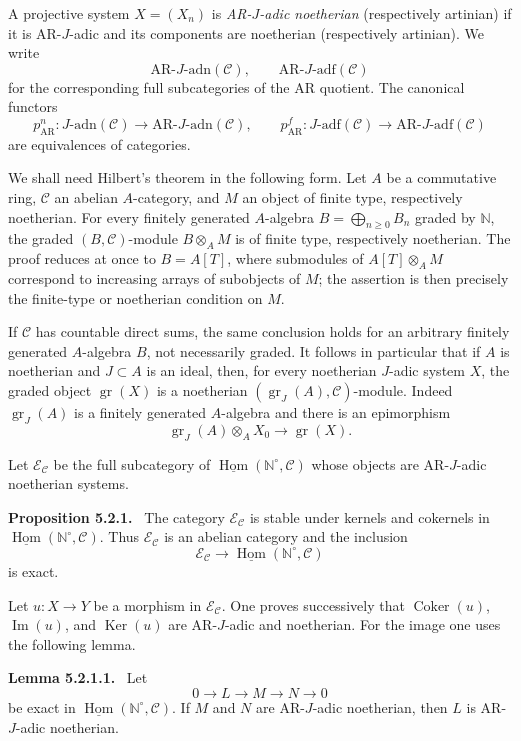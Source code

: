 \documentclass[12pt]{article}
\newcommand{\bN}{\mathbb N}
\newcommand{\cC}{\mathcal C}
\newcommand{\cE}{\mathcal E}
\newcommand{\Hom}{\operatorname{Hom}}
\newcommand{\Ker}{\operatorname{Ker}}
\newcommand{\Coker}{\operatorname{Coker}}
\newcommand{\Imn}{\operatorname{Im}}
\newcommand{\gr}{\operatorname{gr}}
\newcommand{\adn}{\mathrm{adn}}
\newcommand{\adf}{\mathrm{adf}}
\newcommand{\AR}{\mathrm{AR}}
\newenvironment{statement}[1]{\par\medskip\noindent\textbf{#1.}\ }{\par\medskip}
\begin{document}
A projective system $X=(X_n)$ is \emph{AR-$J$-adic noetherian} (respectively
artinian) if it is AR-$J$-adic and its components are noetherian (respectively
artinian). We write
\[
     \AR\text{-}J\text{-}\adn(\cC),
     \qquad
     \AR\text{-}J\text{-}\adf(\cC)
\]
for the corresponding full subcategories of the AR quotient. The canonical functors
\[
      p_{\AR}^n:J\text{-}\adn(\cC)\to\AR\text{-}J\text{-}\adn(\cC),
      \qquad
      p_{\AR}^f:J\text{-}\adf(\cC)\to\AR\text{-}J\text{-}\adf(\cC)
\]
are equivalences of categories.

We shall need Hilbert's theorem in the following form. Let $A$ be a commutative
ring, $\cC$ an abelian $A$-category, and $M$ an object of finite type,
respectively noetherian. For every finitely generated $A$-algebra
$B=\bigoplus_{n\ge0}B_n$ graded by $\bN$, the graded $(B,\cC)$-module
$B\otimes_AM$ is of finite type, respectively noetherian. The proof reduces at once
to $B=A[T]$, where submodules of $A[T]\otimes_AM$ correspond to increasing arrays
of subobjects of $M$; the assertion is then precisely the finite-type or noetherian
condition on $M$.

If $\cC$ has countable direct sums, the same conclusion holds for an arbitrary
finitely generated $A$-algebra $B$, not necessarily graded. It follows in particular
that if $A$ is noetherian and $J\subset A$ is an ideal, then, for every noetherian
$J$-adic system $X$, the graded object $\gr(X)$ is a noetherian
$(\gr_J(A),\cC)$-module. Indeed $\gr_J(A)$ is a finitely generated $A$-algebra and
there is an epimorphism
\[
     \gr_J(A)\otimes_A X_0\longrightarrow \gr(X).
\]

Let $\cE_\cC$ be the full subcategory of $\underline{\Hom}(\bN^\circ,\cC)$ whose
objects are AR-$J$-adic noetherian systems.

\begin{statement}{Proposition 5.2.1}
The category $\cE_\cC$ is stable under kernels and cokernels in
$\underline{\Hom}(\bN^\circ,\cC)$. Thus $\cE_\cC$ is an abelian category and the
inclusion
\[
       \cE_\cC\longrightarrow \underline{\Hom}(\bN^\circ,\cC)
\]
is exact.
\end{statement}

Let $u:X\to Y$ be a morphism in $\cE_\cC$. One proves successively that
$\Coker(u)$, $\Imn(u)$, and $\Ker(u)$ are AR-$J$-adic and noetherian. For the
image one uses the following lemma.

\begin{statement}{Lemma 5.2.1.1}
Let
\[
       0\to L\to M\to N\to0
\]
be exact in $\underline{\Hom}(\bN^\circ,\cC)$. If $M$ and $N$ are AR-$J$-adic
noetherian, then $L$ is AR-$J$-adic noetherian.
\end{statement}
\end{document}
